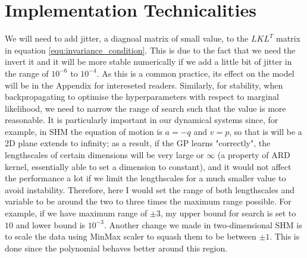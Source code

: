 \documentclass{statsmsc}
\begin{document}
\section{Implementation Technicalities}
We will need to add jitter, a diagnoal matrix of small value, to the $LKL^T$ matrix in equation \ref{equ:invariance_condition}.
This is due to the fact that we need the invert it and it will be more stable numerically if we add a little bit of jitter in the range of $10^{-6}$ to $10^{-4}$.
As this is a common practice, its effect on the model will be in the Appendix for intereseted readers.
Similarly, for stability, when backpropagating to optimise the hyperparameters with respect to marginal likelihood, we need to narrow the range of search such that the value is more reasonable.
It is particularly important in our dynamical systems since, for example, in SHM the equation of motion is $a=-q$ and $v=p$, so that is will be a 2D plane extends to infinity;
as a result, if the GP learns "correctly", the lengthscales of certain dimensions will be very large or $\infty$ (a property of ARD kernel, essentially able to set a dimension to constant), and it would not affect the performance a lot if we limit the lengthscales for a much smaller value to avoid instability.
Therefore, here I would set the range of both lengthscales and variable to be around the two to three times the maximum range possible.
For example, if we have maximum range of $\pm 3$, my upper bound for search is set to $10$ and lower bound is $10^{-3}$.
Another change we made in two-dimensional SHM is to scale the data using MinMax scaler to squash them to be between $\pm 1$. 
This is done since the polynomial behaves better around this region.
\end{document}
